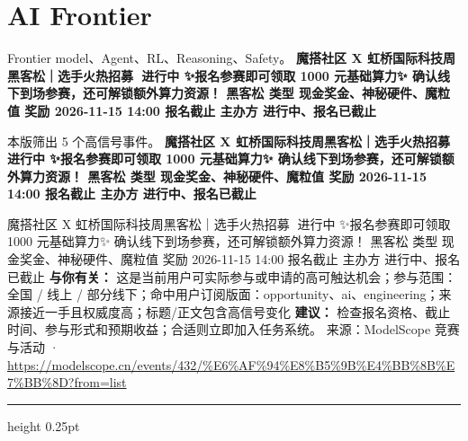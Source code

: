 \documentclass[10.5pt]{ctexart}
\begin{document}
\section*{AI Frontier}
{\color{ormuted} Frontier model、Agent、RL、Reasoning、Safety。}
\vspace{2mm}
{\LARGE\bfseries 魔搭社区 X 虹桥国际科技周黑客松｜选手火热招募🚀 进行中 ✨报名参赛即可领取 1000 元基础算力✨ 确认线下到场参赛，还可解锁额外算力资源！ 黑客松 类型 现金奖金、神秘硬件、魔粒值 奖励 2026-11-15 14:00 报名截止 主办方 进行中、报名已截止}\par
\vspace{1mm}
{\color{ormuted} 本版筛出 5 个高信号事件。}
\vspace{3mm}
{\Large\bfseries 魔搭社区 X 虹桥国际科技周黑客松｜选手火热招募🚀 进行中 ✨报名参赛即可领取 1000 元基础算力✨ 确认线下到场参赛，还可解锁额外算力资源！ 黑客松 类型 现金奖金、神秘硬件、魔粒值 奖励 2026-11-15 14:00 报名截止 主办方 进行中、报名已截止}\par
魔搭社区 X 虹桥国际科技周黑客松｜选手火热招募🚀 进行中 ✨报名参赛即可领取 1000 元基础算力✨ 确认线下到场参赛，还可解锁额外算力资源！ 黑客松 类型 现金奖金、神秘硬件、魔粒值 奖励 2026-11-15 14:00 报名截止 主办方 进行中、报名已截止
\textbf{与你有关：} 这是当前用户可实际参与或申请的高可触达机会；参与范围：全国 / 线上 / 部分线下；命中用户订阅版面：opportunity、ai、engineering；来源接近一手且权威度高；标题/正文包含高信号变化
\textbf{建议：} 检查报名资格、截止时间、参与形式和预期收益；合适则立即加入任务系统。
{\footnotesize\color{ormuted} 来源：ModelScope 竞赛与活动 · \url{https://modelscope.cn/events/432/%E6%AF%94%E8%B5%9B%E4%BB%8B%E7%BB%8D?from=list}}
\vspace{4mm}
\hrule height 0.25pt
\vspace{3mm}
\end{document}
